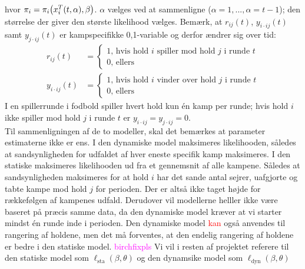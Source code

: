 \documentclass[11pt,a4paper]{article}
\begin{document}
hvor $\pi_i=\pi_i\big{(}x_i^T(t,\alpha),\beta\big{)}$. $\alpha$ vælges ved at sammenligne ($\alpha=1,...,\alpha=t-1$); den størrelse der giver den største likelihood vælges. Bemærk, at $r_{ij}(t)$, $y_{i\cdot ij}(t)$ samt $y_{j\cdot ij}(t)$ er kampspecifikke {0,1}-variable og derfor ændrer sig over tid:
\begin{align*}
r_{ij}(t)&=\begin{cases}
1\text{, hvis hold $i$ spiller mod hold $j$ i runde $t$}\\
0\text{, ellers}
\end{cases}\\
y_{i\cdot ij}(t)&=\begin{cases}
1\text{, hvis hold $i$ vinder over hold $j$ i runde $t$}\\
0\text{, ellers}
\end{cases}
\end{align*}
I en spillerrunde i fodbold spiller hvert hold kun én kamp per runde; hvis hold $i$ ikke spiller mod hold $j$ i runde $t$ er $y_{i\cdot ij}=y_{j\cdot ij}=0$.\\
Til sammenligningen af de to modeller, skal det bemærkes at parameter estimaterne ikke er ens. I den dynamiske model maksimeres likelihooden, således at sandsynligheden for udfaldet af hver eneste specifik kamp maksimeres. I den statiske maksimeres likelihooden ud fra et gennemsnit af alle kampene. Således at sandsynligheden maksimeres for at hold $i$ har det sande antal sejrer, uafgjorte og tabte kampe mod hold $j$ for perioden. Der er altså ikke taget højde for rækkefølgen af kampenes udfald. Derudover vil modellerne helller ikke være baseret på præcis samme data, da den dynamiske model kræver at vi starter mindst én runde inde i perioden. Den dynamiske model \textcolor{red}{kan} også anvendes til rangering af holdene, men det må forventes, at den endelig rangering af holdene er bedre i den statiske model. \textcolor{magenta}{birchfixpls} Vi vil i resten af projektet referere til den statiske model som $\ell_{\text{sta}}(\beta,\theta)$ og den dynamsike model som $\ell_{\text{dyn}}(\beta,\theta)$
\end{document}
